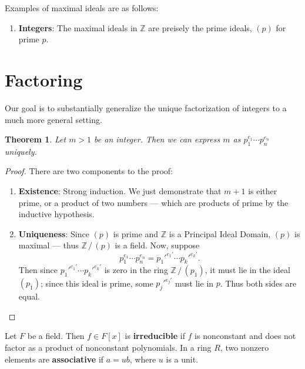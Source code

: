 \documentclass[11pt]{article}
\newtheorem{theorem}{Theorem}
\begin{document}
Examples of maximal ideals are as follows:
\begin{enumerate}
  \item \textbf{Integers}: The maximal ideals in $\mathbb{Z}$ are preisely the prime ideals, $(p)$ for prime $p$.
\end{enumerate}


\section{Factoring}

Our goal is to substantially generalize the unique factorization of integers to a much more general setting.

\begin{adjustwidth}{0.5cm}{}
  \begin{theorem}
    Let $m > 1$ be an integer. Then we can express $m$ as $p_{1}^{e_{1}} \cdots p_{n}^{e_{n}}$ uniquely.
  \end{theorem}
  \begin{proof}
    There are two components to the proof:
    \begin{enumerate}
      \item \textbf{Existence}: Strong induction. We just demonstrate that $m + 1$ is either prime, or a product of two numbers --- which are products of prime by the inductive hypothesis.
      \item \textbf{Uniqueness}: Since $(p)$ is prime and $\mathbb{Z}$ is a Principal Ideal Domain, $(p)$ is maximal --- thus $\mathbb{Z} \, / \, (p)$ is a field. Now, suppose 
        \[
          p_{1}^{e_{1}} \cdots p_{n}^{e_{n}} = p_{1}'^{e_{1}'} \cdots p_{k}'^{e_{k}'}.
        \]
        Then since $p_{1}'^{e_{1}'} \cdots p_{k}'^{e_{k}'}$ is zero in the ring $\mathbb{Z} \, / \, (p_{1})$, it must lie in the ideal $(p_{1})$; since this ideal is prime, some $p_{j}'^{e_{j}'}$ must lie in $p$. Thus both sides are equal. 
    \end{enumerate}
  \end{proof}
\end{adjustwidth}

Let $F$ be a field. Then $f \in F[x]$ is \textbf{irreducible} if $f$ is nonconstant and does not factor as a product of nonconstant polynomials. In a ring $R$, two nonzero elements are \textbf{associative} if $a = ub$, where $u$ is a unit.
\end{document}

